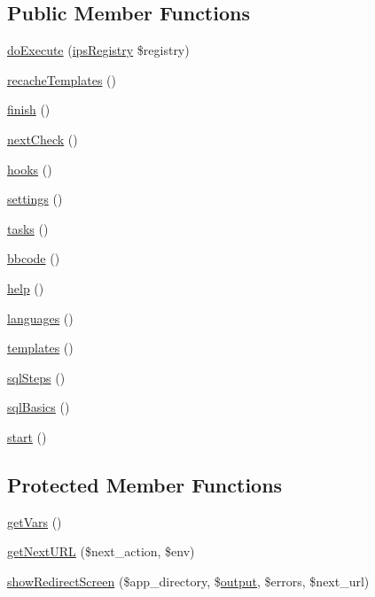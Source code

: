 \subsection*{Public Member Functions}
\begin{DoxyCompactItemize}
\item 
\hyperlink{classadmin__core__applications__setup_afbc4e912a0604b94d47d66744c64d8ba}{do\-Execute} (\hyperlink{classips_registry}{ips\-Registry} \$registry)
\item 
\hyperlink{classadmin__core__applications__setup_aaa303d5b74adec953a452dcaffbce153}{recache\-Templates} ()
\item 
\hyperlink{classadmin__core__applications__setup_a826a7fe6f0083f2a1e81c1e3750d9c3e}{finish} ()
\item 
\hyperlink{classadmin__core__applications__setup_a74fbfc5e4d8acad37208cbdfb81b011e}{next\-Check} ()
\item 
\hyperlink{classadmin__core__applications__setup_a3dd517e83b8cb9a5e643bf422cf11291}{hooks} ()
\item 
\hyperlink{classadmin__core__applications__setup_ad7354383714c6ae99d6ee1bfb95ab49f}{settings} ()
\item 
\hyperlink{classadmin__core__applications__setup_a62f47b1a4fd49b4508f46be1d32ec031}{tasks} ()
\item 
\hyperlink{classadmin__core__applications__setup_a0d196d23f293e4df9bd3bd75ff5b63ae}{bbcode} ()
\item 
\hyperlink{classadmin__core__applications__setup_a91482c4db18186b33acbaf1528a50ddc}{help} ()
\item 
\hyperlink{classadmin__core__applications__setup_adda8fc15b6fe0efc05a50d2645189c77}{languages} ()
\item 
\hyperlink{classadmin__core__applications__setup_acc6055b0dbafa51fac24f330966ccdd1}{templates} ()
\item 
\hyperlink{classadmin__core__applications__setup_a2169999ef528332c55ace0e092012b62}{sql\-Steps} ()
\item 
\hyperlink{classadmin__core__applications__setup_a78c9f2870ae2af90451f1fb779302902}{sql\-Basics} ()
\item 
\hyperlink{classadmin__core__applications__setup_af8fa59992209e36dccb3eefb0f75531f}{start} ()
\end{DoxyCompactItemize}
\subsection*{Protected Member Functions}
\begin{DoxyCompactItemize}
\item 
\hyperlink{classadmin__core__applications__setup_ab81a1d1cef7f7d6c406e60bd368f94af}{get\-Vars} ()
\item 
\hyperlink{classadmin__core__applications__setup_aaf63f437716c58658e4177a4cd90054b}{get\-Next\-U\-R\-L} (\$next\-\_\-action, \$env)
\item 
\hyperlink{classadmin__core__applications__setup_a9a928306aeb0c304bfcbf61f0537c8e4}{show\-Redirect\-Screen} (\$app\-\_\-directory, \$\hyperlink{classoutput}{output}, \$errors, \$next\-\_\-url)
\end{DoxyCompactItemize}
